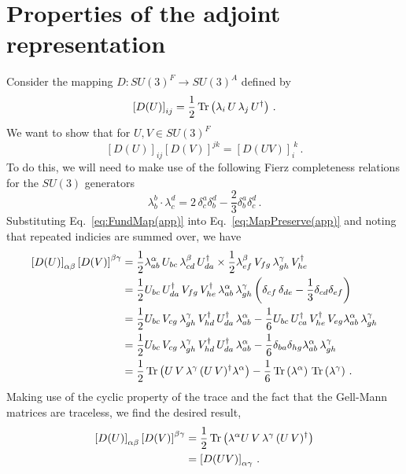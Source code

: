 \chapter{Properties of the adjoint representation}
\label{app:RepMapProof}
Consider the mapping $D:SU(3)^F\rightarrow SU(3)^A$ defined by
%
\begin{equation}
\left[D(U)\right]_{ij} = \frac{1}{2}\operatorname{Tr}\left(\lambda_i \, U \, \lambda_j\, U^\dagger\right)\, .
\label{eq:FundMap(app)}
\end{equation}
%
We want to show that for $U,V\in SU(3)^F$
%
\begin{equation}
\left[D(U)\right]_{ij}\left[D(V)\right]^{jk} = \left[D(U V)\right]_i^{~k}\, .
\label{eq:MapPreserve(app)}
\end{equation}
%
To do this, we will need to make use of the following Fierz completeness relations for the $SU(3)$  generators
%
\begin{equation}
\lambda _ { b } ^ { b } \cdot \lambda _ { c } ^ { d } = 2\, \delta _ { c } ^ { a } \delta _ { b } ^ { d } - \frac { 2 } { 3 } \delta _ { b } ^ { a } \delta _ { c } ^ { d }\, .
\end{equation}
%
Substituting Eq.~\ref{eq:FundMap(app)} into Eq.~\ref{eq:MapPreserve(app)} and noting that repeated indicies are summed over, we have
\begin{align*}
\left[D(U)\right]_{\alpha\beta}\left[D(V)\right]^{\beta\gamma} &= \frac{1}{2} \lambda^\alpha_{ab}\, U_{bc}\,\lambda^\beta_{cd}\, U^\dagger_{da} \times \frac{1}{2} \lambda^\beta_{ef}\, V_{fg}\,\lambda^\gamma_{gh}\, V^\dagger_{he}\\
&=\frac{1}{2} U_{bc}\,U^\dagger_{da}\,V_{fg}\,V^\dagger_{he}\,\lambda^\alpha_{ab}\, \lambda^\gamma_{gh} \left(\delta_{cf}\,\delta_{de} - \frac{1}{3}\delta_{cd}\delta_{ef}\right)\\
&=\frac{1}{2}U_{bc} \, V_{cg} \, \lambda^\gamma_{gh} \, V^\dagger_{hd} \, U^\dagger_{da} \, \lambda^\alpha_{ab} - \frac{1}{6} U_{bc} \, U^\dagger_{ca} \, V^\dagger_{he} \, V_{eg} \lambda^\alpha_{ab}\, \lambda^\gamma_{gh}\\
&= \frac{1}{2}U_{bc} \, V_{cg} \, \lambda^\gamma_{gh} \, V^\dagger_{hd} \, U^\dagger_{da} \, \lambda^\alpha_{ab} - \frac{1}{6}\delta_{ba}\delta_{hg} \lambda^\alpha_{ab}\, \lambda^\gamma_{gh}\\
&=\frac{1}{2}\operatorname{Tr}\left(U \, V \, \lambda^\gamma \, (U \, V)^\dagger \lambda^\alpha\right) - \frac{1}{6}\operatorname{Tr}\left(\lambda^\alpha\right) \, \operatorname{Tr}\left(\lambda^\gamma\right)\, .
\end{align*}
Making use of the cyclic property of the trace and the fact that the Gell-Mann matrices are traceless, we find the desired result,
%
\begin{align*}
\left[D(U)\right]_{\alpha\beta}\left[D(V)\right]^{\beta\gamma} &= \frac{1}{2}\operatorname{Tr}\left(\lambda^\alpha U \, V \, \lambda^\gamma \, (U \, V)^\dagger \right)\\
&= \left[D(UV)\right]_{\alpha\gamma} \, .
\end{align*}\\

